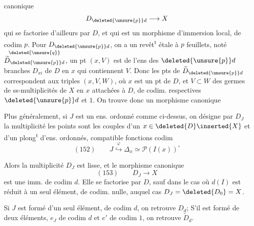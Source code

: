 
canonique
\[
D_{\deleted{\unsure{p}}d}\longrightarrow X
\]
qui se factorise d'ailleurs par $D$, et qui est un morphisme d'immersion local, de codim $p$. Pour $D_{\deleted{\unsure{p}}d}$, on a un revêt\textsuperscript{t} étale à $p$ feuillets, noté $\overset{\deleted{\unsure{q}}}{\widetilde D_{\deleted{\unsure{p}}d}}$,  un pt $(x,V)$ est  de l'ens des $\deleted{\unsure{p}}d$ branches $D_{xi}$ de $D$ en $x$ qui contiennent $V$. Donc les  pts de $\widetilde D_{\deleted{\unsure{p}}d}$ correspondent aux triples $(x,V,W)$, où $x$ est un pt de $D$, et $V\subset W$ des germes de ss-multiplicités de $X$ en $x$ attachées à $D$, de codim. respectives $\deleted{\unsure{p}}d$ et $1$. On trouve donc un morphisme canonique

Plus généralement, si $J$ est un ens.  ordonné comme ci-dessus,  on  désigne par $D_J$ la  multiplicité  les points sont les couples d'un $x\in\deleted{D}\inserted{X}$  et d'un plong\textsuperscript{t} d'ens. ordonnés, compatible  fonctions codim
\[
(152)\qquad J\mathrel{\overset{\varphi}{\hookrightarrow}}\Delta_x\simeq\mathcal P(I(x))^\circ
\]


Alors la multiplicité $D_J$ est lisse,  et le morphisme canonique
\[
(153)\qquad D_J\longrightarrow X
\]
est une imm.  de codim $d$.
Elle se factorise par $D$, sauf dans le cas où $d(I)$ est réduit à un seul élément, de codim. nulle, auquel cas $D_J=\deleted{D_0}=X$.

Si $J$ est formé d'un seul élément, de codim $d$, on retrouve $D_d$; S'il est formé de deux éléments,  $e_J$ de codim $d$ et $e'$ de codim $1$, on retrouve $\widetilde D_d$.

